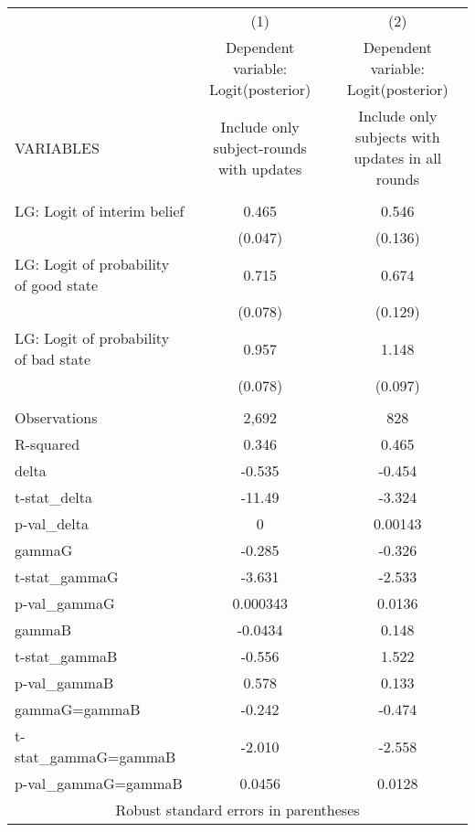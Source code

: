 \documentclass[]{article}
\begin{document}
\begin{tabular}{lcc} \hline
 & (1) & (2) \\
 & Dependent variable: Logit(posterior) & Dependent variable: Logit(posterior) \\
VARIABLES & Include only subject-rounds with updates & Include only subjects with updates in all rounds \\ \hline
 &  &  \\
LG: Logit of interim belief & 0.465 & 0.546 \\
 & (0.047) & (0.136) \\
LG: Logit of probability of good state & 0.715 & 0.674 \\
 & (0.078) & (0.129) \\
LG: Logit of probability of bad state & 0.957 & 1.148 \\
 & (0.078) & (0.097) \\
 &  &  \\
Observations & 2,692 & 828 \\
R-squared & 0.346 & 0.465 \\
delta & -0.535 & -0.454 \\
t-stat\_delta & -11.49 & -3.324 \\
p-val\_delta & 0 & 0.00143 \\
gammaG & -0.285 & -0.326 \\
t-stat\_gammaG & -3.631 & -2.533 \\
p-val\_gammaG & 0.000343 & 0.0136 \\
gammaB & -0.0434 & 0.148 \\
t-stat\_gammaB & -0.556 & 1.522 \\
p-val\_gammaB & 0.578 & 0.133 \\
gammaG=gammaB & -0.242 & -0.474 \\
t-stat\_gammaG=gammaB & -2.010 & -2.558 \\
 p-val\_gammaG=gammaB & 0.0456 & 0.0128 \\ \hline
\multicolumn{3}{c}{ Robust standard errors in parentheses} \\
\end{tabular}
\end{document}
